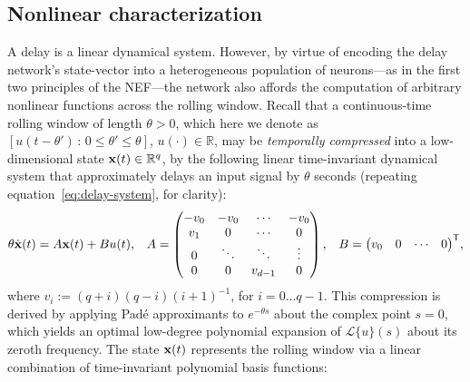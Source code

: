\subsection{Nonlinear characterization}
\label{sec:delay-nonlinear}

A delay is a linear dynamical system.
However, by virtue of encoding the delay network's state-vector into a heterogeneous population of neurons---as in the first two principles of the NEF---the network also affords the computation of arbitrary nonlinear functions across the rolling window.
Recall that a continuous-time rolling window of length $\theta > 0$, which here we denote as $\left[ u(t - \theta') \,:\, 0 \le \theta' \le \theta \right]$, $u(\cdot) \in \mathbb{R}$, may be \emph{temporally compressed} into a low-dimensional state $\mathbf{x}(t) \in \mathbb{R}^q$, by the following linear time-invariant dynamical system that approximately delays an input signal by $\theta$ seconds (repeating equation~\ref{eq:delay-system}, for clarity):
\begin{equation*}
  \theta \dot{\mathbf{x}}(t) = A\mathbf{x}(t) + Bu(t) \text{,} \quad
  A = \begin{pmatrix} -v_0 & -v_0 & \cdots & -v_0 \\ v_1 & 0 & \cdots & 0 \\ 0 & \ddots & \ddots & \vdots \\ 0 & 0 & v_{d-1} & 0\end{pmatrix} \text{,} \quad 
  B = {\begin{pmatrix} v_0 & 0 & \cdots & 0\end{pmatrix}}^\mathsf{T} \text{,} 
\end{equation*}
where $v_i := (q+i)(q-i)(i+1)^{-1}$, %
for $i = 0 \ldots q-1$.
This compression is derived by applying Pad\'e approximants to $e^{-\theta s}$ about the complex point $s=0$, which yields an optimal low-degree polynomial expansion of $\mathcal{L}\{u\}(s)$ about its zeroth frequency.
The state $\mathbf{x}(t)$ represents the rolling window via a linear combination of time-invariant polynomial basis functions:
